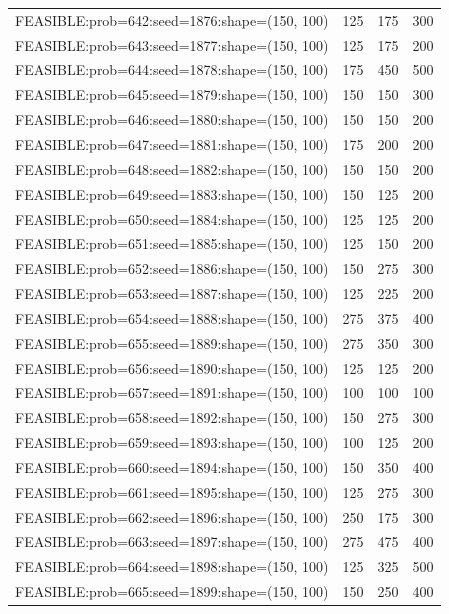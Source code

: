 \begin{longtable}{lccc}
FEASIBLE:prob=642:seed=1876:shape=(150, 100) &  125 &   175 &    300 \\
FEASIBLE:prob=643:seed=1877:shape=(150, 100) &  125 &   175 &    200 \\
FEASIBLE:prob=644:seed=1878:shape=(150, 100) &  175 &   450 &    500 \\
FEASIBLE:prob=645:seed=1879:shape=(150, 100) &  150 &   150 &    300 \\
FEASIBLE:prob=646:seed=1880:shape=(150, 100) &  150 &   150 &    200 \\
FEASIBLE:prob=647:seed=1881:shape=(150, 100) &  175 &   200 &    200 \\
FEASIBLE:prob=648:seed=1882:shape=(150, 100) &  150 &   150 &    200 \\
FEASIBLE:prob=649:seed=1883:shape=(150, 100) &  150 &   125 &    200 \\
FEASIBLE:prob=650:seed=1884:shape=(150, 100) &  125 &   125 &    200 \\
FEASIBLE:prob=651:seed=1885:shape=(150, 100) &  125 &   150 &    200 \\
FEASIBLE:prob=652:seed=1886:shape=(150, 100) &  150 &   275 &    300 \\
FEASIBLE:prob=653:seed=1887:shape=(150, 100) &  125 &   225 &    200 \\
FEASIBLE:prob=654:seed=1888:shape=(150, 100) &  275 &   375 &    400 \\
FEASIBLE:prob=655:seed=1889:shape=(150, 100) &  275 &   350 &    300 \\
FEASIBLE:prob=656:seed=1890:shape=(150, 100) &  125 &   125 &    200 \\
FEASIBLE:prob=657:seed=1891:shape=(150, 100) &  100 &   100 &    100 \\
FEASIBLE:prob=658:seed=1892:shape=(150, 100) &  150 &   275 &    300 \\
FEASIBLE:prob=659:seed=1893:shape=(150, 100) &  100 &   125 &    200 \\
FEASIBLE:prob=660:seed=1894:shape=(150, 100) &  150 &   350 &    400 \\
FEASIBLE:prob=661:seed=1895:shape=(150, 100) &  125 &   275 &    300 \\
FEASIBLE:prob=662:seed=1896:shape=(150, 100) &  250 &   175 &    300 \\
FEASIBLE:prob=663:seed=1897:shape=(150, 100) &  275 &   475 &    400 \\
FEASIBLE:prob=664:seed=1898:shape=(150, 100) &  125 &   325 &    500 \\
FEASIBLE:prob=665:seed=1899:shape=(150, 100) &  150 &   250 &    400 \\

\end{longtable}
